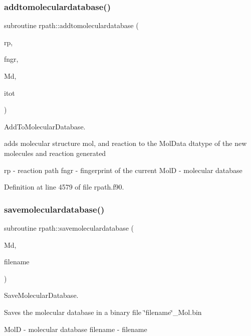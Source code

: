\subsubsection{\texorpdfstring{addtomoleculardatabase()}{addtomoleculardatabase()}}
{\footnotesize\ttfamily subroutine rpath\+::addtomoleculardatabase (\begin{DoxyParamCaption}\item[{type(\mbox{\hyperlink{structrpath_1_1rxp}{rxp}})}]{rp,  }\item[{type(\mbox{\hyperlink{structrpath_1_1fingerprint}{fingerprint}})}]{fngr,  }\item[{type(\mbox{\hyperlink{structglobaldata_1_1moldata}{moldata}})}]{Md,  }\item[{integer}]{itot }\end{DoxyParamCaption})}



Add\+To\+Molecular\+Database. 

adds molecular structure mol, and reaction to the Mol\+Data dtatype of the new molecules and reaction generated

rp -\/ reaction path fngr -\/ fingerprint of the current MolD -\/ molecular database 

Definition at line 4579 of file rpath.\+f90.

\mbox{\label{namespacerpath_a8d4afda6b550a4857b9800f7d94cb87b}} 
\subsubsection{\texorpdfstring{savemoleculardatabase()}{savemoleculardatabase()}}
{\footnotesize\ttfamily subroutine rpath\+::savemoleculardatabase (\begin{DoxyParamCaption}\item[{type(\mbox{\hyperlink{structglobaldata_1_1moldata}{moldata}})}]{Md,  }\item[{character, dimension($\ast$)}]{filename }\end{DoxyParamCaption})}



Save\+Molecular\+Database. 

Saves the molecular database in a binary file \char`\"{}filename\char`\"{}\+\_\+\+Mol.\+bin

MolD -\/ molecular database filename -\/ filename 


